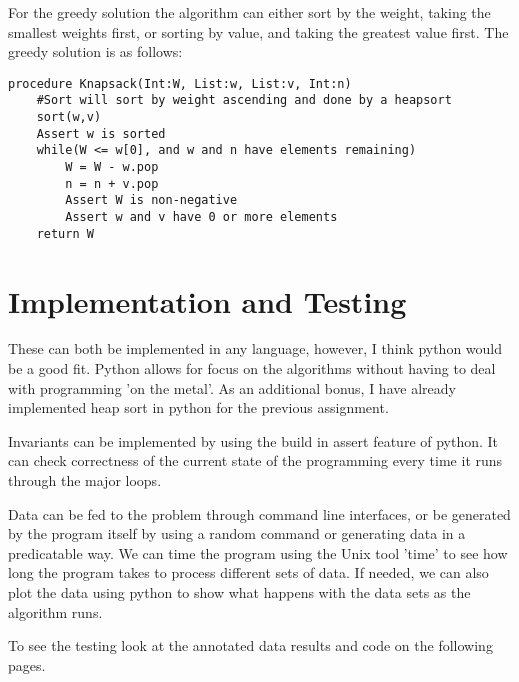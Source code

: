 \documentclass{article}
\begin{document}
For the greedy solution the algorithm can either sort by the weight, taking the
smallest weights first, or sorting by value, and taking the greatest value 
first. The greedy solution is as follows:


\begin{lstlisting}
procedure Knapsack(Int:W, List:w, List:v, Int:n)
	#Sort will sort by weight ascending and done by a heapsort
	sort(w,v)
	Assert w is sorted
	while(W <= w[0], and w and n have elements remaining)
		W = W - w.pop
		n = n + v.pop
		Assert W is non-negative
		Assert w and v have 0 or more elements
	return W
\end{lstlisting}

\section{Implementation and Testing}
These can both be implemented in any language, however, I think python would be
a good fit. Python allows for focus on the algorithms without having to deal
with programming 'on the metal'. As an additional bonus, I have already
implemented heap sort in python for the previous assignment.

Invariants can be implemented by using the build in assert feature of python.
It can check correctness of the current state of the programming every time it
runs through the major loops.

Data can be fed to the problem through command line interfaces, or be generated
by the program itself by using a random command or generating data in a
predicatable way. We can time the program using the Unix tool 'time' to see
how long the program takes to process different sets of data. If needed, we can
also plot the data using python to show what happens with the data sets as the
algorithm runs.

To see the testing look at the annotated data results and code on the following pages.
\end{document}
